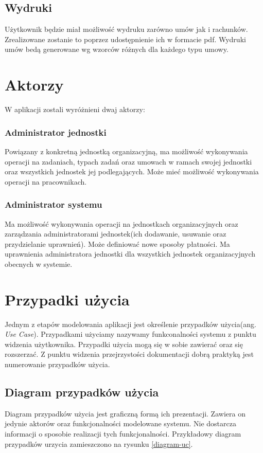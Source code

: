 \subsection[Wydruki][Wydruki]{Wydruki}
Użytkownik będzie miał możliwość wydruku zarówno umów jak i rachunków. Zrealizowane zostanie to poprzez udostępnienie ich w formacie pdf. Wydruki umów bedą generowane wg wzorców różnych dla każdego typu umowy.

\section[Aktorzy][Aktorzy]{Aktorzy}
W aplikacji zostali wyróżnieni dwaj aktorzy:

\subsubsection{Administrator jednostki}
Powiązany z konkretną jednostką organizacyjną, ma możliwość wykonywania operacji na zadaniach, typach zadań oraz umowach w ramach swojej jednostki oraz wszystkich jednostek jej podlegających. Może mieć możliwość wykonywania operacji na pracownikach.

\subsubsection{Administrator systemu}
Ma możliwość wykonywania operacji na jednostkach organizacyjnych oraz zarządzania administratorami jednostek(ich dodawanie, usuwanie oraz przydzielanie uprawnień). Może definiować nowe sposoby płatności. Ma uprawnienia administratora jednostki dla wszystkich jednostek organizacyjnych obecnych w systemie.

\section[Przypadki użycia][Przypadki użycia]{Przypadki użycia}
Jednym z etapów modelowania aplikacji jest określenie przypadków użycia(ang. \textit{Use Case}). Przypadkami użyciamy nazywamy funkconalności systemu z punktu widzenia użytkownika. Przypadki użycia mogą się w sobie zawierać oraz się rozszerzać. Z punktu widzenia przejrzystości dokumentacji dobrą praktyką jest numerowanie przypadków użycia.

\subsection[Diagram przypadków użycia][Diagram przypadków użycia]{Diagram przypadków użycia}
Diagram przypadków użycia jest graficzną formą ich prezentacji. Zawiera on jedynie aktorów oraz funkcjonalności modelowane systemu. Nie dostarcza informacji o sposobie realizacji tych funkcjonalności. Przykładowy diagram przypadków urzycia zamieszczono na rysunku \ref{diagram-uc}.


